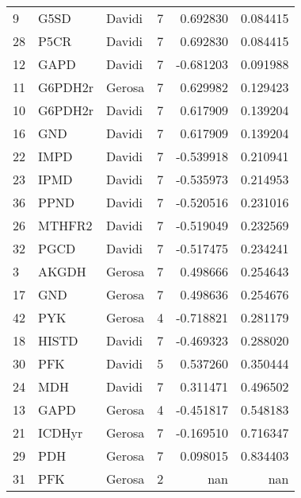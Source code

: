 \begin{tabular}{lllrrr}
9 & G5SD & Davidi & 7 & 0.692830 & 0.084415 \\
28 & P5CR & Davidi & 7 & 0.692830 & 0.084415 \\
12 & GAPD & Davidi & 7 & -0.681203 & 0.091988 \\
11 & G6PDH2r & Gerosa & 7 & 0.629982 & 0.129423 \\
10 & G6PDH2r & Davidi & 7 & 0.617909 & 0.139204 \\
16 & GND & Davidi & 7 & 0.617909 & 0.139204 \\
22 & IMPD & Davidi & 7 & -0.539918 & 0.210941 \\
23 & IPMD & Davidi & 7 & -0.535973 & 0.214953 \\
36 & PPND & Davidi & 7 & -0.520516 & 0.231016 \\
26 & MTHFR2 & Davidi & 7 & -0.519049 & 0.232569 \\
32 & PGCD & Davidi & 7 & -0.517475 & 0.234241 \\
3 & AKGDH & Gerosa & 7 & 0.498666 & 0.254643 \\
17 & GND & Gerosa & 7 & 0.498636 & 0.254676 \\
42 & PYK & Gerosa & 4 & -0.718821 & 0.281179 \\
18 & HISTD & Davidi & 7 & -0.469323 & 0.288020 \\
30 & PFK & Davidi & 5 & 0.537260 & 0.350444 \\
24 & MDH & Davidi & 7 & 0.311471 & 0.496502 \\
13 & GAPD & Gerosa & 4 & -0.451817 & 0.548183 \\
21 & ICDHyr & Gerosa & 7 & -0.169510 & 0.716347 \\
29 & PDH & Gerosa & 7 & 0.098015 & 0.834403 \\
31 & PFK & Gerosa & 2 & nan & nan \\
\end{tabular}
